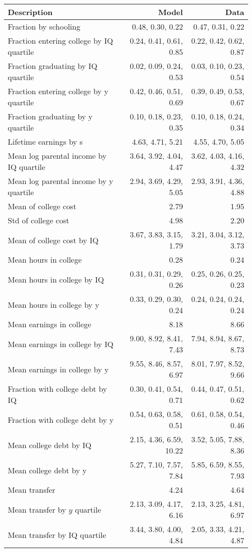 \begin{tabular}{lrr}
\hline
Description & Model  & Data  \\
\hline
Fraction by schooling & 0.48, 0.30, 0.22  & 0.47, 0.31, 0.22  \\
Fraction entering college by IQ quartile & 0.24, 0.41, 0.61, 0.85  & 0.22, 0.42, 0.62, 0.87  \\
Fraction graduating by IQ quartile & 0.02, 0.09, 0.24, 0.53  & 0.03, 0.10, 0.23, 0.54  \\
Fraction entering college by y quartile & 0.42, 0.46, 0.51, 0.69  & 0.39, 0.49, 0.53, 0.67  \\
Fraction graduating by y quartile & 0.10, 0.18, 0.23, 0.35  & 0.10, 0.18, 0.24, 0.34  \\
Lifetime earnings by s & 4.63, 4.71, 5.21  & 4.55, 4.70, 5.05  \\
Mean log parental income by IQ quartile & 3.64, 3.92, 4.04, 4.47  & 3.62, 4.03, 4.16, 4.32  \\
Mean log parental income by y quartile & 2.94, 3.69, 4.29, 5.05  & 2.93, 3.91, 4.36, 4.88  \\
Mean of college cost & 2.79  & 1.95  \\
Std of college cost & 4.98  & 2.20  \\
Mean of college cost by IQ & 3.67, 3.83, 3.15, 1.79  & 3.21, 3.04, 3.12, 3.73  \\
Mean hours in college & 0.28  & 0.24  \\
Mean hours in college by IQ & 0.31, 0.31, 0.29, 0.26  & 0.25, 0.26, 0.25, 0.23  \\
Mean hours in college by y & 0.33, 0.29, 0.30, 0.24  & 0.24, 0.24, 0.24, 0.24  \\
Mean earnings in college & 8.18  & 8.66  \\
Mean earnings in college by IQ & 9.00, 8.92, 8.41, 7.43  & 7.94, 8.94, 8.67, 8.73  \\
Mean earnings in college by y & 9.55, 8.46, 8.57, 6.97  & 8.01, 7.97, 8.52, 9.66  \\
Fraction with college debt by IQ & 0.30, 0.41, 0.54, 0.71  & 0.44, 0.47, 0.51, 0.62  \\
Fraction with college debt by y & 0.54, 0.63, 0.58, 0.51  & 0.61, 0.58, 0.54, 0.46  \\
Mean college debt by IQ & 2.15, 4.36, 6.59, 10.22  & 3.52, 5.05, 7.88, 8.36  \\
Mean college debt by y & 5.27, 7.10, 7.57, 7.84  & 5.85, 6.59, 8.55, 7.93  \\
Mean transfer & 4.24  & 4.64  \\
Mean transfer by $y$ quartile & 2.13, 3.09, 4.17, 6.16  & 2.13, 3.25, 4.81, 6.97  \\
Mean transfer by IQ quartile & 3.44, 3.80, 4.00, 4.84  & 2.05, 3.33, 4.21, 4.87  \\
\hline
\end{tabular}%
